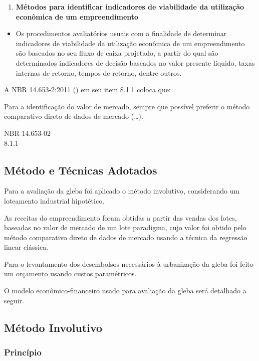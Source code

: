 \documentclass[
  10pt,
  a4paper]{article}
\providecommand{\tightlist}{%
  \setlength{\itemsep}{0pt}\setlength{\parskip}{0pt}}
\begin{document}
\begin{enumerate}
\def\labelenumi{\alph{enumi}.}
\setcounter{enumi}{2}
\tightlist
\item
  \textbf{Métodos para identificar indicadores de viabilidade da
  utilização econômica de um empreendimento}
\end{enumerate}

\begin{itemize}
\tightlist
\item
  Os procedimentos avaliatórios usuais com a finalidade de determinar
  indicadores de viabilidade da utilização econômica de um
  empreendimento são baseados no seu fluxo de caixa projetado, a partir
  do qual são determinados indicadores de decisão baseados no valor
  presente líquido, taxas internas de retorno, tempos de retorno, dentre
  outros.
\end{itemize}

A NBR 14.653-2:2011 () em seu item
8.1.1 coloca que:

\epigraph{Para a identificação do valor de mercado, sempre que possível preferir
o método comparativo direto de dados de mercado (\ldots).}{NBR 14.653-02\\8.1.1}

\subsection{Método e Técnicas
Adotados}\label{muxe9todo-e-tuxe9cnicas-adotados}

Para a avaliação da gleba foi aplicado o método involutivo, considerando
um loteamento industrial hipotético.

As receitas do empreendimento foram obtidas a partir das vendas dos
lotes, baseadas no valor de mercado de um lote paradigma, cujo valor foi
obtido pelo método comparativo direto de dados de mercado usando a
técnica da regressão linear clássica.

Para o levantamento dos desembolsos necessários à urbanização da gleba
foi feito um orçamento usando custos paramétricos.

O modelo econômico-financeiro usado para avaliação da gleba será
detalhado a seguir.

\subsection{Método Involutivo}\label{muxe9todo-involutivo}

\subsubsection{Princípio}\label{princuxedpio}
\end{document}
